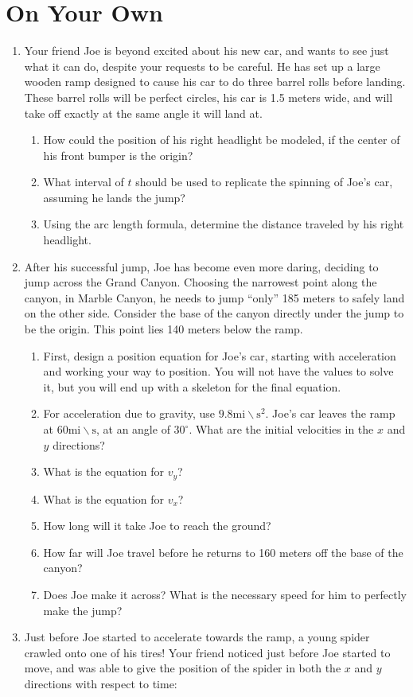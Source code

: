 \documentclass{ximera}
\begin{document}
\section{On Your Own}
\begin{enumerate}
\item Your friend Joe is beyond excited about his new car, and wants to see just what it can do, despite your requests to be careful. He has set up a large wooden ramp designed to cause his car to do three barrel rolls before landing. These barrel rolls will be perfect circles, his car is 1.5 meters wide, and will take off exactly at the same angle it will land at.
\begin{enumerate}
\item How could the position of his right headlight be modeled, if the center of his front bumper is the origin?
\item What interval of $t$ should be used to replicate the spinning of Joe's car, assuming he lands the jump?
\item Using the arc length formula, determine the distance traveled by his right headlight.
\end{enumerate}
\item After his successful jump, Joe has become even more daring, deciding to jump across the Grand Canyon. Choosing the narrowest point along the canyon, in Marble Canyon, he needs to jump ``only'' 185 meters to safely land on the other side. Consider the base of the canyon directly under the jump to be the origin. This point lies 140 meters below the ramp.
\begin{enumerate}
\item First, design a position equation for Joe's car, starting with acceleration and working your way to position. You will not have the values to solve it, but you will end up with a skeleton for the final equation.
\item For acceleration due to gravity, use $9.8 \text{mi} \backslash \text{s}^2$. Joe's car leaves the ramp at $60 \text{mi}\backslash \text{s}$, at an angle of $30^\circ$. What are the initial velocities in the $x$ and $y$ directions?
\item What is the equation for $v_{y}$?
\item What is the equation for $v_x$?
\item How long will it take Joe to reach the ground?
\item How far will Joe travel before he returns to 160 meters off the base of the canyon?
\item Does Joe make it across? What is the necessary speed for him to perfectly make the jump?
\end{enumerate}
\item Just before Joe started to accelerate towards the ramp, a young spider crawled onto one of his tires! Your friend noticed just before Joe started to move, and was able to give the position of the spider in both the $x$ and $y$ directions with respect to time:


\end{enumerate}
\end{document}
